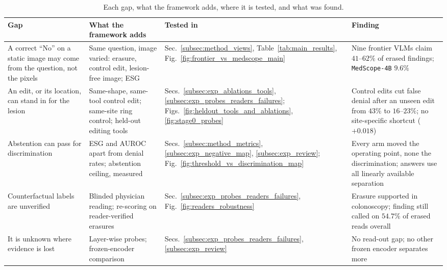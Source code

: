 \documentclass[5p,times,twocolumn,authoryear]{elsarticle}
\begin{document}
\begin{table}[!t]
\caption{Each gap, what the framework adds, where it is tested, and what was found.}
\label{tab:gap_map}
\begin{center}
\small
\begin{adjustbox}{max width=\linewidth}
\begin{tabular}{L{3.4cm}L{3.7cm}L{2.5cm}L{4.6cm}}
\toprule
\textbf{Gap} & \textbf{What the framework adds} & \textbf{Tested in} & \textbf{Finding} \\
\midrule
A correct ``No'' on a static image may come from the question, not the pixels & Same question, image varied: erasure, control edit, lesion-free image; ESG & Sec.~\ref{subsec:method_views}, Table~\ref{tab:main_results}, Fig.~\ref{fig:frontier_vs_medscope_main} & Nine frontier VLMs claim $41$--$62\%$ of erased findings; \texttt{MedScope-4B} $9.6\%$ \\
An edit, or its location, can stand in for the lesion & Same-shape, same-tool control edit; same-site ring control; held-out editing tools & Secs.~\ref{subsec:exp_ablations_tools}, \ref{subsec:exp_probes_readers_failures}; Figs.~\ref{fig:heldout_tools_and_ablations}, \ref{fig:stage0_probes} & Control edits cut false denial after an unseen edit from $43\%$ to $16$--$23\%$; no site-specific shortcut ($+0.018$) \\
Abstention can pass for discrimination & ESG and AUROC apart from denial rates; abstention ceiling, measured & Secs.~\ref{subsec:method_metrics}, \ref{subsec:exp_negative_map}, \ref{subsec:exp_review}; Fig.~\ref{fig:threshold_vs_discrimination_map} & Every arm moved the operating point, none the discrimination; answers use all linearly available separation \\
Counterfactual labels are unverified & Blinded physician reading; re-scoring on reader-verified erasures & Sec.~\ref{subsec:exp_probes_readers_failures}, Fig.~\ref{fig:readers_robustness} & Erasure supported in colonoscopy; finding still called on $54.7\%$ of erased reads overall \\
It is unknown where evidence is lost & Layer-wise probes; frozen-encoder comparison & Secs.~\ref{subsec:exp_probes_readers_failures}, \ref{subsec:exp_review} & No read-out gap; no other frozen encoder separates more \\
\bottomrule
\end{tabular}
\end{adjustbox}
\end{center}
\end{table}
\end{document}
